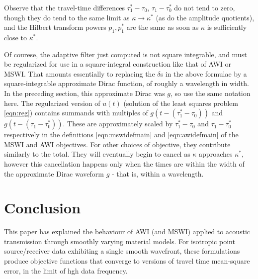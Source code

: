 Observe that the travel-time differences $\tau^*_1-\tau_0$,
$\tau_1-\tau_0^*$ do not tend to zero, though they do tend to the same
limit as $\kappa \rightarrow \kappa^*$ (as do the amplitude quotients), and the
Hilbert transform powers $p_1, p_1^*$ are the same as soon as $\kappa$ is
sufficiently close to $\kappa^*$.

Of courese, the adaptive filter just computed is not square
integrable, and must be regularized for use in a square-integral
construction like that of AWI or MSWI. That amounts essentially to
replacing the $\delta$s in the above formulae by a square-integrable
approximate Dirac function, of roughly a wavelength in width. In the
preceding section, this approximate Dirac was $g$, so use the same
notation here. The regularized version of $u(t)$ (solution of the
least squares problem \ref{eqn:reg}) contains summands with multiples of $g(t-(\tau^*_1-\tau_0))$
and $g(t-(\tau_1-\tau^*_0))$. These are approximately scaled by
$\tau^*_1-\tau_0$ and $\tau_1-\tau^*_0$ respectively in the
definitions \ref{eqn:mswidefmain} and \ref{eqn:awidefmain} of the MSWI and AWI
objectives. For other choices of objective, they contribute similarly
to the total. They will eventually begin to cancel as $\kappa$ approaches
$\kappa^*$, however this cancellation happens only when the times are
within the width of the approximate 
Dirac waveform $g$ - that is, within a wavelength.



\section{Conclusion}


This paper has explained the behaviour of AWI (and MSWI) applied to
acoustic transmission through smoothly varying material models. For
isotropic point source/receiver data exhibiting a single smooth
wavefront, these formulations produce objective functions that converge
to versions of travel time mean-square error, in the limit of hgh
data frequency. 

